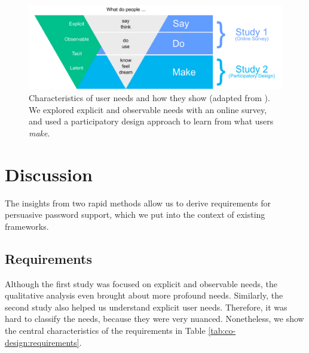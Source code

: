 
\begin{figure}
	\centering
	\includegraphics[width=\linewidth]{figures/co-design/exploration-overview}
	\caption{\label{fig:co-design:exploration-overview} Characteristics of user needs and how they show (adapted from  \cite{Sanders2002ParticipatoryDesign}). We explored explicit and observable needs with an online survey, and used a participatory design approach to learn from what users \textit{make}.}
\end{figure}



		
		


\section{Discussion}
The insights from two rapid methods allow us to derive requirements for persuasive password support, which we put into the context of existing frameworks. 

\subsection{Requirements}
Although the first study was focused on explicit and observable needs, the qualitative analysis even brought about more profound needs. Similarly, the second study also helped us understand explicit user needs. Therefore, it was hard to classify the needs, because they were very nuanced. Nonetheless, we show the central characteristics of the requirements in Table \ref{tab:co-design:requirements}.


